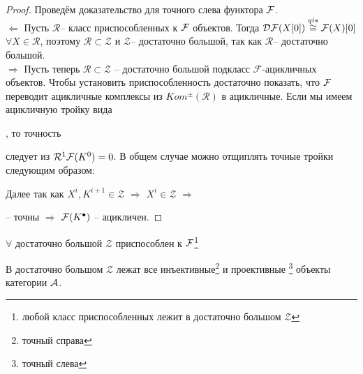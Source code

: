 \documentclass[../main.tex]{subfiles}
\begin{document}
\begin{proof} Проведём доказательство для точного слева функтора $\mathcal{F}$.\\
$\Leftarrow$ Пусть $\mathcal{R}$-- класс приспособленных к $\mathcal{F}$ объектов. Тогда $\mathcal{D F}(X[0])\overset{qis}{\cong} \mathcal{F}(X)[0]$ $\forall X \in \mathcal{R}$, поэтому $\mathcal{R} \subset \mathcal{Z}$ и $\mathcal{Z}$-- достаточно большой, так как $\mathcal{R}$-- достаточно большой.\\
$\Rightarrow$ Пусть теперь $\mathcal{R} \subset \mathcal{Z}$ -- достаточно большой подкласс $\mathcal{F}$-ацикличных объектов. Чтобы установить приспособленность достаточно показать, что $\mathcal{F}$ переводит ацикличные комплексы из $Kom^{\pm}(\mathcal{R})$ в ацикличные. Если мы имеем ацикличную тройку вида , то точность  следует из $\mathcal{R}^1\mathcal{F}(K^0)=0$. В общем случае можно отщиплять точные тройки следующим образом:
\bee
{}
\eee
Далее так как $X^i, K^{i+1} \in \mathcal{Z}$ $\Rightarrow$ $X^i \in \mathcal{Z}$ $\Rightarrow$  -- точны $\Rightarrow$ $\mathcal{F}(K^\bullet)$ -- ацикличен.
\end{proof}
\begin{to_claim}
$\forall$ достаточно большой $\mathcal{Z}$ приспособлен к $\mathcal{F}$\footnote{любой класс приспособленных лежит в достаточно большом $\mathcal{Z}$}
\end{to_claim}
\begin{to_claim}
В достаточно большом $\mathcal{Z}$ лежат все инъективные\footnote{точный справа} и проективные \footnote{точный слева} объекты категории $\mathcal{A}$.
\end{to_claim}
\end{document}
